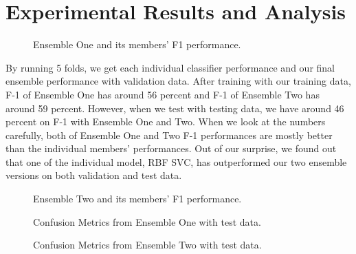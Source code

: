 \section{Experimental Results and Analysis}

 \begin{figure}[th]
  \centering
  
  \caption{Ensemble One and its members' F1 performance.}
    \label{fig:E1_F1_result_barchart}
\end{figure}



 By running 5 folds, we get each individual classifier performance and our final ensemble performance with validation data.  After training with our training data, F-1 of Ensemble One has around 56 percent and F-1 of Ensemble Two has around 59 percent. However,  when we test with testing data, we have around 46 percent on F-1 with Ensemble One and Two. When we look at the numbers carefully, both of Ensemble One and Two F-1 performances are mostly better than the individual members' performances. Out of our surprise, we found out that one of the individual model, RBF SVC, has outperformed  our two ensemble versions on both validation and test data.
 


 \begin{figure}[bh]
  \centering
  
  \caption{Ensemble Two and its members' F1 performance.}
    \label{fig:E1_F1_result_barchart}
\end{figure}

 \begin{figure}[H]
  \centering
  
  \caption{Confusion Metrics from Ensemble One with test data.}
    \label{fig:CM_Ensemble1-testdata}
\end{figure}

 \begin{figure}[H]
  \centering
  
  \caption{Confusion Metrics from Ensemble Two with test data.}
    \label{fig:CM_Ensemble2-testdata}
\end{figure}